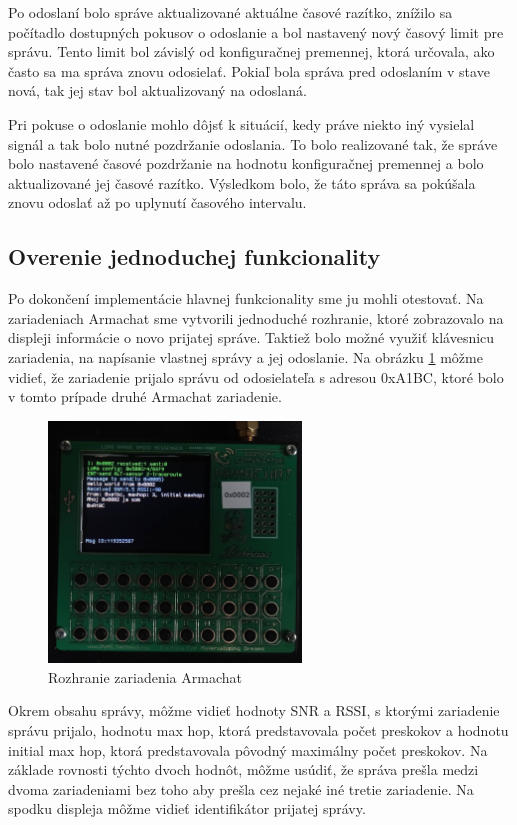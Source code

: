 \documentclass[slovak,master]{diploma}
\begin{document}
Po odoslaní bolo správe aktualizované aktuálne časové razítko, znížilo sa počítadlo dostupných pokusov o odoslanie a bol nastavený nový časový limit pre správu. Tento 
limit bol závislý od konfiguračnej premennej, ktorá určovala, ako často sa ma správa znovu odosielať. Pokiaľ bola správa pred odoslaním v stave nová, tak jej stav bol aktualizovaný 
na odoslaná.

Pri pokuse o odoslanie mohlo dôjsť k situácií, kedy práve niekto iný vysielal signál a tak bolo nutné pozdržanie odoslania. To bolo realizované tak, že správe bolo nastavené 
časové pozdržanie na hodnotu konfiguračnej premennej a bolo aktualizované jej časové razítko. Výsledkom bolo, že táto správa sa pokúšala znovu odoslať až po uplynutí 
časového intervalu.

\subsection{Overenie jednoduchej funkcionality}
Po dokončení implementácie hlavnej funkcionality sme ju mohli otestovať. Na zariadeniach Armachat sme vytvorili jednoduché rozhranie, 
ktoré zobrazovalo na displeji informácie o novo prijatej správe. Taktiež bolo možné využiť klávesnicu zariadenia, na napísanie vlastnej správy a jej odoslanie.
Na obrázku \ref{fig:armRec} môžme vidieť, že zariadenie prijalo správu od odosielateľa s adresou 0xA1BC, ktoré bolo v tomto prípade druhé Armachat zariadenie.
\begin{figure}
	\centering
	\includegraphics[width=0.6\textwidth]{Figures/armRec.jpg}
	\caption{Rozhranie zariadenia Armachat}
	\label{fig:armRec}
\end{figure}

Okrem obsahu správy, môžme vidieť hodnoty SNR a RSSI, s ktorými zariadenie správu prijalo, hodnotu max hop, ktorá predstavovala počet preskokov a hodnotu initial max hop, 
ktorá predstavovala pôvodný maximálny počet preskokov. Na základe rovnosti týchto dvoch hodnôt, môžme usúdiť, že správa prešla medzi dvoma zariadeniami bez toho aby prešla 
cez nejaké iné tretie zariadenie. Na spodku displeja môžme vidieť identifikátor prijatej správy.
\end{document}
